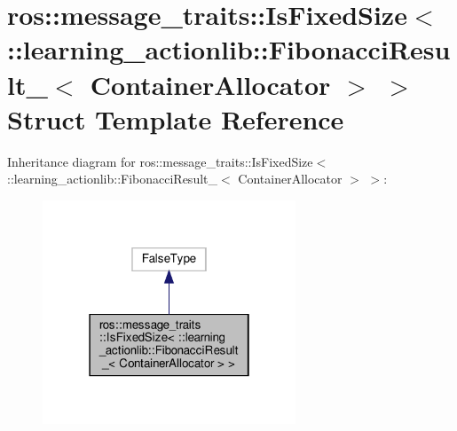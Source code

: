 \hypertarget{structros_1_1message__traits_1_1IsFixedSize_3_01_1_1learning__actionlib_1_1FibonacciResult___3_01ContainerAllocator_01_4_01_4}{}\section{ros\+:\+:message\+\_\+traits\+:\+:Is\+Fixed\+Size$<$ \+:\+:learning\+\_\+actionlib\+:\+:Fibonacci\+Result\+\_\+$<$ Container\+Allocator $>$ $>$ Struct Template Reference}
\label{structros_1_1message__traits_1_1IsFixedSize_3_01_1_1learning__actionlib_1_1FibonacciResult___3_01ContainerAllocator_01_4_01_4}


Inheritance diagram for ros\+:\+:message\+\_\+traits\+:\+:Is\+Fixed\+Size$<$ \+:\+:learning\+\_\+actionlib\+:\+:Fibonacci\+Result\+\_\+$<$ Container\+Allocator $>$ $>$\+:
\nopagebreak
\begin{figure}[H]
\begin{center}
\leavevmode
\includegraphics[width=214pt]{structros_1_1message__traits_1_1IsFixedSize_3_01_1_1learning__actionlib_1_1FibonacciResult___3_069513a4e5ac059cbcee2140bf3526202}
\end{center}
\end{figure}


